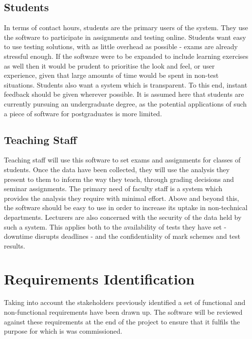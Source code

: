 \documentclass[12pt,a4paper,twoside]{report}
\begin{document}
\subsection{Students}
In terms of contact hours, students are the primary users of the system. They use the software to participate in assignments and testing online. Students want easy to use testing solutions, with as little overhead as possible - exams are already stressful enough. If the software were to be expanded to include learning exercises as well then it would be prudent to prioritise the look and feel, or user experience, given that large amounts of time would be spent in non-test situations. Students also want a system which is transparent. To this end, instant feedback should be given wherever possible. It is assumed here that students are currently pursuing an undergraduate degree, as the potential applications of such a piece of software for postgraduates is more limited.

\subsection{Teaching Staff}
Teaching staff will use this software to set exams and assignments for classes of students. Once the data have been collected, they will use the analysis they present to them to inform the way they teach, through grading decisions and seminar assignments. The primary need of faculty staff is a system which provides the analysis they require with minimal effort. Above and beyond this, the software should be easy to use in order to increase its uptake in non-technical departments. Lecturers are also concerned with the security of the data held by such a system. This applies both to the availability of tests they have set - downtime disrupts deadlines - and the confidentiality of mark schemes and test results.

\section{Requirements Identification}
Taking into account the stakeholders previously identified a set of functional and non-functional requirements have been drawn up. The software will be reviewed against these requirements at the end of the project to ensure that it fulfils the purpose for which is was commissioned.
\end{document}
